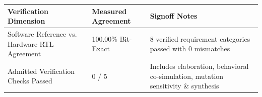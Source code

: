 \documentclass[11pt,a4paper]{article}
\begin{document}
{\small\renewcommand{\arraystretch}{1.18}\begin{longtable}{@{}L{0.38\textwidth}|L{0.22\textwidth}|L{0.32\textwidth}@{}}\toprule

\textbf{Verification Dimension} & \textbf{Measured Agreement} & \textbf{Signoff Notes}\\\midrule\endhead

Software Reference vs. Hardware RTL Agreement & 100.00\% Bit-Exact & 8 verified requirement categories passed with 0 mismatches\\[2pt]\hline

Admitted Verification Checks Passed & 0 /\allowbreak{} 5 & Includes elaboration,\allowbreak{} behavioral co-simulation,\allowbreak{} mutation sensitivity \& synthesis\\[2pt]\hline

\bottomrule\end{longtable}}
\end{document}

